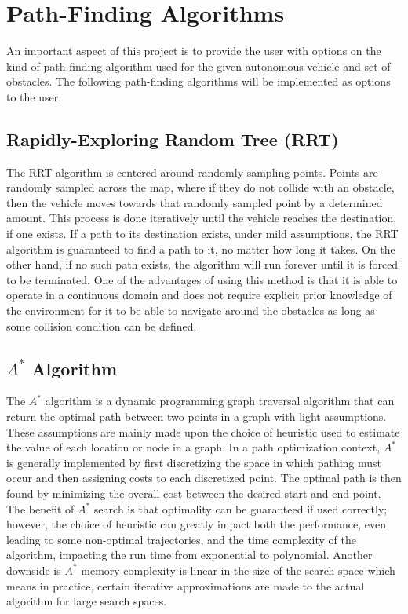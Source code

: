 \documentclass[10pt,twocolumn,letterpaper]{article}
\begin{document}
\section*{Path-Finding Algorithms}

An important aspect of this project is to provide the user with options on the kind of path-finding algorithm used for the given autonomous vehicle and set of obstacles. The following path-finding algorithms will be implemented as options to the user.

\subsection*{Rapidly-Exploring Random Tree (RRT)}
The RRT algorithm is centered around randomly sampling points. Points are randomly sampled across the map, where if they do not collide with an obstacle, then the vehicle moves towards that randomly sampled point by a determined amount. This process is done iteratively until the vehicle reaches the destination, if one exists. If a path to its destination exists, under mild assumptions, the RRT algorithm is guaranteed to find a path to it, no matter how long it takes. On the other hand, if no such path exists, the algorithm will run forever until it is forced to be terminated. One of the advantages of using this method is that it is able to operate in a continuous domain and does not require explicit prior knowledge of the environment for it to be able to navigate around the obstacles as long as some collision condition can be defined.

\subsection*{$A^*$ Algorithm}
The $A^*$ algorithm is a dynamic programming graph traversal algorithm that can return the optimal path between two points in a graph with light assumptions. These assumptions are mainly made upon the choice of heuristic used to estimate the value of each location or node in a graph. In a path optimization context, $A^*$ is generally implemented by first discretizing the space in which pathing must occur and then assigning costs to each discretized point. The optimal path is then found by minimizing the overall cost between the desired start and end point. The benefit of $A^*$ search is that optimality can be guaranteed if used correctly; however, the choice of heuristic can greatly impact both the performance, even leading to some non-optimal trajectories, and the time complexity of the algorithm, impacting the run time from exponential to polynomial. Another downside is $A^*$ memory complexity is linear in the size of the search space which means in practice, certain iterative approximations are made to the actual algorithm for large search spaces.
\end{document}
